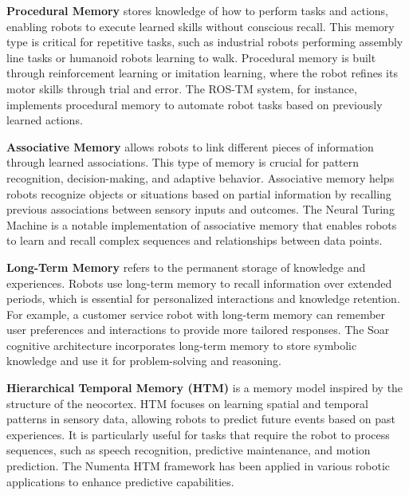         \textbf{Procedural Memory} stores knowledge of how to perform tasks and actions, enabling robots to execute learned skills without conscious recall. This memory type is critical for repetitive tasks, such as industrial robots performing assembly line tasks or humanoid robots learning to walk. Procedural memory is built through reinforcement learning or imitation learning, where the robot refines its motor skills through trial and error. The ROS-TM system, for instance, implements procedural memory to automate robot tasks based on previously learned actions. \cite{tenorth-2013-knowrob-knowledge-processing-infrastructure}
        
        \textbf{Associative Memory} allows robots to link different pieces of information through learned associations. This type of memory is crucial for pattern recognition, decision-making, and adaptive behavior. Associative memory helps robots recognize objects or situations based on partial information by recalling previous associations between sensory inputs and outcomes. The Neural Turing Machine is a notable implementation of associative memory that enables robots to learn and recall complex sequences and relationships between data points. \cite{graves-2014-neural-turing-machines}
        
        \textbf{Long-Term Memory} refers to the permanent storage of knowledge and experiences. Robots use long-term memory to recall information over extended periods, which is essential for personalized interactions and knowledge retention. For example, a customer service robot with long-term memory can remember user preferences and interactions to provide more tailored responses. The Soar cognitive architecture incorporates long-term memory to store symbolic knowledge and use it for problem-solving and reasoning. \cite{laird-2012-soar-cognitive-architecture}
        
        \textbf{Hierarchical Temporal Memory (HTM)} is a memory model inspired by the structure of the neocortex. HTM focuses on learning spatial and temporal patterns in sensory data, allowing robots to predict future events based on past experiences. It is particularly useful for tasks that require the robot to process sequences, such as speech recognition, predictive maintenance, and motion prediction. The Numenta HTM framework has been applied in various robotic applications to enhance predictive capabilities. \cite{hawkins-2004-on-intelligence}



